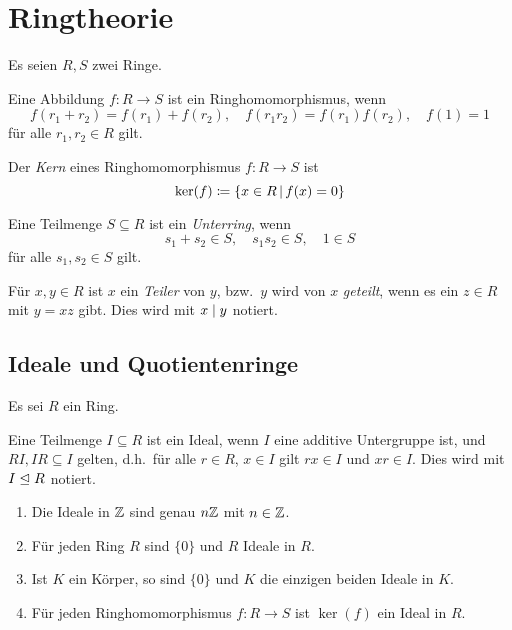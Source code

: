 \chapter{Ringtheorie}

Es seien $R, S$ zwei Ringe.

\begin{definition}
  Eine Abbildung $f \colon R \to S$ ist ein Ringhomomorphismus, wenn
  \[
      f(r_1 + r_2)
    = f(r_1) + f(r_2),
    \quad
      f(r_1 r_2)
    = f(r_1) f(r_2),
    \quad
      f(1) = 1
  \]
  für alle $r_1, r_2 \in R$ gilt.
\end{definition}

\begin{definition}
  Der \emph{Kern} eines Ringhomomorphismus $f \colon R \to S$ ist
  \[
              \ker(f)
    \defined  \{x \in R \suchthat f(x) = 0\}
  \]
\end{definition}

\begin{definition}
  Eine Teilmenge $S \subseteq R$ ist ein \emph{Unterring}, wenn
  \[
    s_1 + s_2 \in S,
    \quad
    s_1 s_2 \in S,
    \quad
    1 \in S
  \]
  für alle $s_1, s_2 \in S$ gilt.
\end{definition}

\begin{definition}
  Für $x, y \in R$ ist $x$ ein \emph{Teiler} von $y$, bzw.\ $y$ wird von $x$ \emph{geteilt}, wenn es ein $z \in R$ mit $y = xz$ gibt.
  Dies wird mit $x \mathrel{|} y$ notiert.
\end{definition}




\section{Ideale und Quotientenringe}

Es sei $R$ ein Ring.

\begin{definition}
  Eine Teilmenge $I \subseteq R$ ist ein Ideal, wenn $I$ eine additive Untergruppe ist, und $RI, IR \subseteq I$ gelten, d.h.\ für alle $r \in R$, $x \in I$ gilt $rx \in I$ und $xr \in I$.
  Dies wird mit $I \mathrel{\trianglelefteq} R$ notiert.
\end{definition}

\begin{example}
  \begin{enumerate}
    \item
      Die Ideale in $\mathbb{Z}$ sind genau $n\mathbb{Z}$ mit $n \in \mathbb{Z}$.
    \item
      Für jeden Ring $R$ sind $\{0\}$ und $R$ Ideale in $R$.
    \item
      Ist $K$ ein Körper, so sind $\{0\}$ und $K$ die einzigen beiden Ideale in $K$.
    \item
      Für jeden Ringhomomorphismus $f \colon R \to S$ ist $\ker(f)$ ein Ideal in $R$.
  \end{enumerate}
\end{example}

